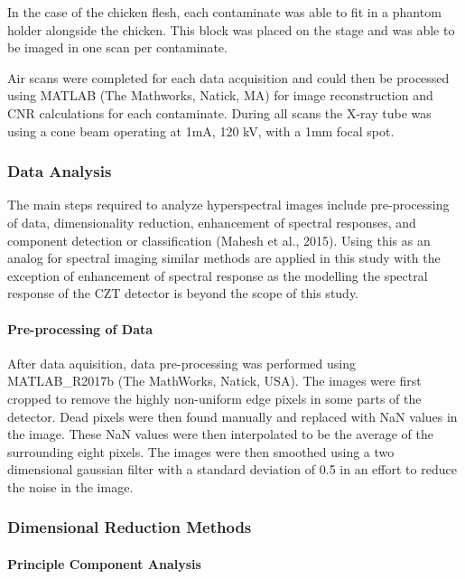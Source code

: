 \documentclass[11pt]{article}
\begin{document}
In the case of the chicken flesh, each contaminate was able to fit in a
phantom holder alongside the chicken. This block was placed on the stage
and was able to be imaged in one scan per contaminate.

Air scans were completed for each data acquisition and could then be
processed using MATLAB (The Mathworks, Natick, MA) for image
reconstruction and CNR calculations for each contaminate. During all
scans the X-ray tube was using a cone beam operating at 1mA, 120 kV,
with a 1mm focal spot.

    \hypertarget{data-analysis}{%
\subsubsection{Data Analysis}\label{data-analysis}}

    The main steps required to analyze hyperspectral images include
pre-processing of data, dimensionality reduction, enhancement of
spectral responses, and component detection or classification (Mahesh et
al., 2015). Using this as an analog for spectral imaging similar methods
are applied in this study with the exception of enhancement of spectral
response as the modelling the spectral response of the CZT detector is
beyond the scope of this study.

    \hypertarget{pre-processing-of-data}{%
\paragraph{Pre-processing of Data}\label{pre-processing-of-data}}

    After data aquisition, data pre-processing was performed using
MATLAB\_R2017b (The MathWorks, Natick, USA). The images were first
cropped to remove the highly non-uniform edge pixels in some parts of
the detector. Dead pixels were then found manually and replaced with NaN
values in the image. These NaN values were then interpolated to be the
average of the surrounding eight pixels. The images were then smoothed
using a two dimensional gaussian filter with a standard deviation of 0.5
in an effort to reduce the noise in the image.

    \hypertarget{dimensional-reduction-methods}{%
\subsubsection{Dimensional Reduction
Methods}\label{dimensional-reduction-methods}}

    \hypertarget{principle-component-analysis}{%
\paragraph{Principle Component
Analysis}\label{principle-component-analysis}}
\end{document}
